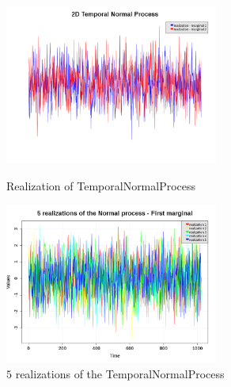 \begin{figure}[H]
  \begin{minipage}{9cm}
    \begin{center}
      \includegraphics[width=7cm]{Figures/temporalNormal2D_realization.png}
      \caption{Realization of TemporalNormalProcess}
      \label{temporalNormalProcess_Realization}
    \end{center}
  \end{minipage}
  \hfill
  \begin{minipage}{9cm}
    \begin{center}
      \includegraphics[width=7cm]{Figures/temporalNormal2D_realizations.png}
      \caption{$5$ realizations of the TemporalNormalProcess}
      \label{temporalNormalProcess_Realizations}
    \end{center}
  \end{minipage}
\end{figure}



